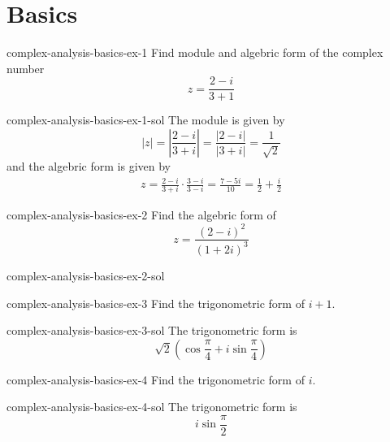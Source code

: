 \documentclass[preview]{standalone}
\begin{document}
\genpage

\section{Basics}

\begin{snippetexercise}{complex-analysis-basics-ex-1}{}
    Find module and algebric form of the complex number 
    \[
        z = \frac{2-i}{3+1}
    \]
\end{snippetexercise}

\begin{snippetsolution}{complex-analysis-basics-ex-1-sol}{}
    The module is given by
    \[
        |z| = \left|\frac{2-i}{3+i}\right| = \frac{|2-i|}{|3+i|}
        = \frac{1}{\sqrt{2}}
    \]
    and the algebric form is given by
    \begin{align*}
        z = \frac{2-i}{3+i} \cdot \frac{3-i}{3-i} = \frac{7-5i}{10}
        = \frac{1}{2} + \frac{i}{2}
    \end{align*}
\end{snippetsolution}

\begin{snippetexercise}{complex-analysis-basics-ex-2}{}
    Find the algebric form of
    \[
        z = \frac{{(2-i)}^2}{{(1+2i)}^3}
    \]
\end{snippetexercise}

\begin{snippetsolution}{complex-analysis-basics-ex-2-sol}{}
    \todo
\end{snippetsolution}

\begin{snippetexercise}{complex-analysis-basics-ex-3}{}
    Find the trigonometric form of \(i+1\).
\end{snippetexercise}

\begin{snippetsolution}{complex-analysis-basics-ex-3-sol}{}
    The trigonometric form is \[
        \sqrt{2}\left(\cos\frac{\pi}{4} + i\sin\frac{\pi}{4}\right)
    \]
\end{snippetsolution}

\begin{snippetexercise}{complex-analysis-basics-ex-4}{}
    Find the trigonometric form of \(i\).
\end{snippetexercise}

\begin{snippetsolution}{complex-analysis-basics-ex-4-sol}{}
    The trigonometric form is \[
        i\sin\frac{\pi}{2}
    \]
\end{snippetsolution}
\end{document}
